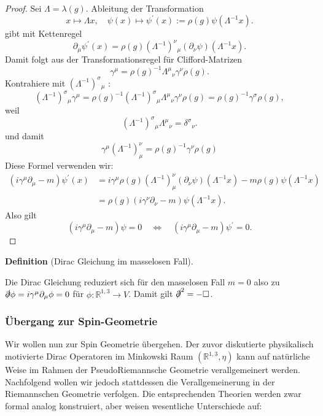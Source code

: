 \documentclass[10pt, letterpaper]{article}
\newcommand{\R}{\mathbb{R}}
\newcommand{\CustomHeading}[3]{%
  \par\medskip\noindent%
  \textbf{#1 #2} \textnormal{(#3)}.\enskip%
}
\newenvironment{DEF}[2]{\CustomHeading{Definition}{#1}{#2}}{}
\begin{document}
\begin{proof}

Sei $\Lambda=\lambda(g)$. Ableitung der Transformation  
$$
x \mapsto \Lambda x, \quad \psi(x) \mapsto \psi^{\prime}(x):=\rho(g) \psi\left(\Lambda^{-1} x\right) .
$$
gibt mit Kettenregel
$$
\partial_\mu \psi^{\prime}(x)=\rho(g)\left(\Lambda^{-1}\right)^\nu{ }_\mu\left(\partial_\nu \psi\right)\left(\Lambda^{-1} x\right) .
$$
Damit folgt aus der Transformationsregel für Clifford-Matrizen
$$
\gamma^\mu=\rho(g)^{-1} \Lambda^\mu{ }_\nu \gamma^\nu \rho(g) .
$$
Kontrahiere mit $\left(\Lambda^{-1}\right)^\sigma{ }_\mu$ :
$$
\left(\Lambda^{-1}\right)^\sigma{ }_\mu \gamma^\mu=\rho(g)^{-1}\left(\Lambda^{-1}\right)^\sigma{ }_\mu \Lambda^\mu{ }_\nu \gamma^\nu \rho(g)=\rho(g)^{-1} \gamma^\sigma \rho(g),
$$
weil
$$
\left(\Lambda^{-1}\right)^\sigma{ }_\mu \Lambda^\mu{ }_\nu=\delta^\sigma{ }_\nu .
$$
und damit
$$
\gamma^\mu\left(\Lambda^{-1}\right)_\mu^\nu=\rho(g)^{-1} \gamma^\nu \rho(g)
$$
Diese Formel verwenden wir:
$$
\begin{aligned}
\left(i \gamma^\mu \partial_\mu-m\right) \psi^{\prime}(x) & =i \gamma^\mu \rho(g)\left(\Lambda^{-1}\right)_\mu^\nu\left(\partial_\nu \psi\right)\left(\Lambda^{-1} x\right)-m \rho(g) \psi\left(\Lambda^{-1} x\right) \\
& =\rho(g)\left(i \gamma^\nu \partial_\nu-m\right) \psi\left(\Lambda^{-1} x\right) .
\end{aligned}
$$
Also gilt
$$
\left(i \gamma^\mu \partial_\mu-m\right) \psi=0 \quad \Longleftrightarrow \quad\left(i \gamma^\mu \partial_\mu-m\right) \psi^{\prime}=0 .
$$
\end{proof}

\begin{DEF}{}{Dirac Gleichung im masselosen Fall}
  Die Dirac Gleichung reduziert sich für den masselosen Fall $m=0$ also zu $\slashed{\partial}\phi=i\gamma^\mu \partial_\mu \phi=0$ für $\phi:\R^{1,3}\to V$. Damit gilt $\slashed{\partial}^2=-\square$.
\end{DEF}


\subsubsection{Übergang zur Spin-Geometrie}

Wir wollen nun zur Spin Geometrie übergehen. Der zuvor diskutierte physikalisch motivierte Dirac Operatoren im Minkowski Raum $(\R^{1,3},\eta)$ kann auf natürliche Weise im Rahmen der PseudoRiemannsche Geometrie verallgemeinert werden. Nachfolgend wollen wir jedoch stattdessen die Verallgemeinerung in der Riemannschen Geometrie verfolgen. Die entsprechenden Theorien werden zwar formal analog konstruiert, aber weisen wesentliche Unterschiede auf:
\end{document}
